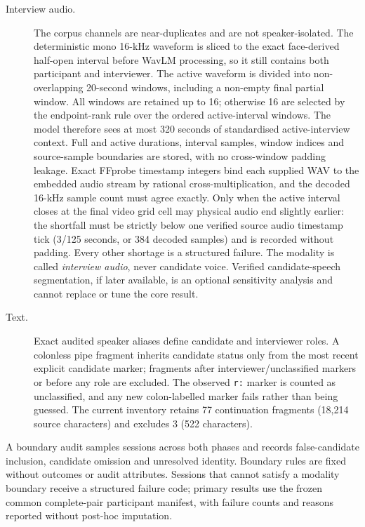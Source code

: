 \begin{description}
    \item[Interview audio.] The corpus channels are
    near-duplicates and are not speaker-isolated. The deterministic mono 16-kHz waveform is sliced
    to the exact face-derived half-open interval before WavLM processing, so it still contains both
    participant and interviewer. The active waveform is divided into non-overlapping 20-second
    windows, including a non-empty final partial window. All windows are retained up to 16;
    otherwise 16 are selected by the endpoint-rank rule over the ordered active-interval windows.
    The model therefore sees at most 320 seconds of standardised active-interview context. Full and
    active durations, interval samples, window indices and source-sample boundaries are stored,
    with no cross-window padding leakage. Exact FFprobe timestamp integers bind each supplied WAV
    to the embedded audio stream by rational cross-multiplication, and the decoded 16-kHz sample
    count must agree exactly. Only when the active interval closes at the final video grid cell may
    physical audio end slightly earlier: the shortfall must be strictly below one verified source
    audio timestamp tick (3/125 seconds, or 384 decoded samples) and is recorded without padding.
    Every other shortage is a structured failure. The modality is called \emph{interview audio}, never
    candidate voice. Verified candidate-speech segmentation, if later available, is an optional
    sensitivity analysis and cannot replace or tune the core result.

    \item[Text.] Exact audited speaker aliases define candidate and interviewer roles. A colonless
    pipe fragment inherits candidate status only from the most recent explicit candidate marker;
    fragments after interviewer/unclassified markers or before any role are excluded. The observed
    \texttt{r:} marker is counted as unclassified, and any new colon-labelled marker fails rather
    than being guessed. The current inventory retains 77 continuation fragments (18,214 source
    characters) and excludes 3 (522 characters).
\end{description}

A boundary audit samples sessions across both phases and records false-candidate inclusion,
candidate omission and unresolved identity. Boundary rules are fixed without outcomes or audit
attributes. Sessions that cannot satisfy a modality boundary receive a structured failure code;
primary results use the frozen common complete-pair participant manifest, with failure counts and reasons reported
without post-hoc imputation.

